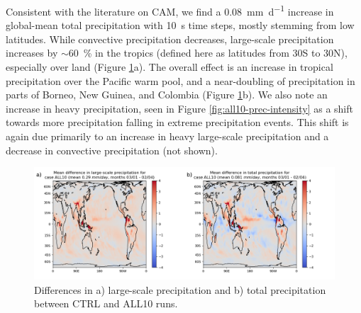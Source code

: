 \documentclass [11pt, proquest] {uwthesis}[2020/02/24]
\begin{document}
Consistent with the literature on CAM, we find a \SI{0.08}{\milli\meter\per\day} increase in global-mean total precipitation with \SI{10}{\second} time steps, mostly stemming from low latitudes. While convective precipitation decreases, large-scale precipitation increases by $\sim$\SI{60}{\percent} in the tropics (defined here as latitudes from \num{30}S to \num{30}N), especially over land (Figure \ref{fig:all10-prec-map}a). The overall effect is an increase in tropical precipitation over the Pacific warm pool, and a near-doubling of precipitation in parts of Borneo, New Guinea, and Colombia (Figure \ref{fig:all10-prec-map}b). We also note an increase in heavy precipitation, seen in Figure \ref{fig:all10-prec-intensity} as a shift towards more precipitation falling in extreme precipitation events. This shift is again due primarily to an increase in heavy large-scale precipitation and a decrease in convective precipitation (not shown).

\begin{figure}
    \centering
    \includegraphics[width=6.5in]{Figure1.png}
    \caption[Differences in large-scale and total precipitation between CTRL and ALL10]{Differences in a) large-scale precipitation and b) total precipitation between CTRL and ALL10 runs.}
    \label{fig:all10-prec-map}
\end{figure}
\end{document}
